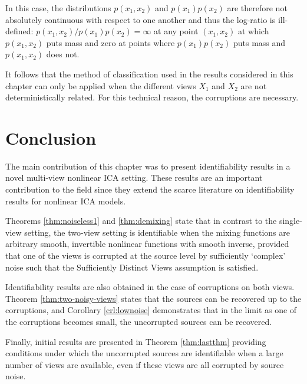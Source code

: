 In this case, the distributions $p(x_1, x_2)$ and $p(x_1)p(x_2)$ are therefore not absolutely continuous with respect to one another and thus the log-ratio is ill-defined: $p(x_1, x_2)/p(x_1)p(x_2) = \infty$ at any point $(x_1,x_2)$ at which $p(x_1, x_2)$ puts mass and zero at points where $p(x_1)p(x_2)$ puts mass and $p(x_1,x_2)$ does not.

It follows that the method of classification used in the results considered in this chapter can only be applied when the different views $X_1$ and $X_2$ are not deterministically related.
For this technical reason, the corruptions are necessary.



\section{Conclusion}
\label{sec:on_suffistv}

The main contribution of this chapter was to present identifiability results in a novel multi-view nonlinear ICA setting.
These results are an important contribution to the field since they extend the scarce literature on identifiability results for nonlinear ICA models.


Theorems \ref{thm:noiseless1} and \ref{thm:demixing} state that in contrast to the single-view setting, the two-view setting is identifiable when the mixing functions are arbitrary smooth, invertible nonlinear functions with smooth inverse, provided that one of the views is corrupted at the source level by sufficiently `complex' noise such that the Sufficiently Distinct Views assumption is satisfied. 

Identifiability results are also obtained in the case of corruptions on both views. Theorem \ref{thm:two-noisy-views} states that the sources can be recovered up to the corruptions, and Corollary \ref{crl:lownoise} demonstrates that in the limit as one of the corruptions becomes small, the uncorrupted sources can be recovered.

Finally, initial results are presented in Theorem \ref{thm:lastthm} providing conditions under which the uncorrupted sources are identifiable when a large number of views are available, even if these views are all corrupted by source noise.



